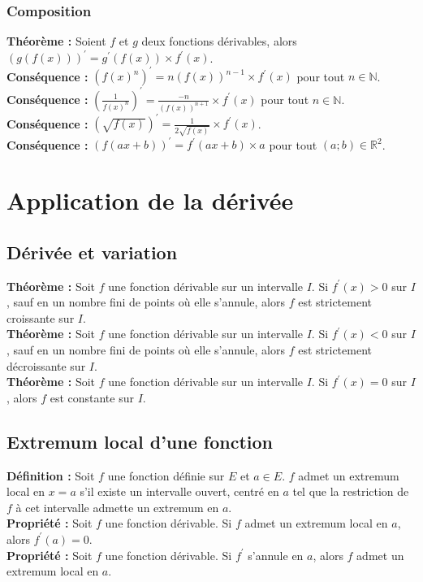 \documentclass[a4paper,titlepage]{article}
\let\oldsection\section
\renewcommand\section{\clearpage\oldsection}
\begin{document}
        \subsubsection{Composition}
            \textbf{Théorème :} Soient $f$ et $g$ deux fonctions dérivables, alors $\left(g\left(f\left(x\right)\right)\right)^{\prime}=g^{\prime}\left(f\left(x\right)\right)\times f^{\prime}\left(x\right)$.
            \\
            \textbf{Conséquence :} $\left(f\left(x\right)^{n}\right)^{\prime}=n\left(f\left(x\right)\right)^{n-1}\times f^{\prime}\left(x\right)$ pour tout $n\in\mathbb{N}$.
            \\
            \textbf{Conséquence :} $\left(\frac{1}{f\left(x\right)^{n}}\right)^{\prime}=\frac{-n}{\left(f\left(x\right)\right)^{n+1}}\times f^{\prime}\left(x\right)$ pour tout $n\in\mathbb{N}$.
            \\
            \textbf{Conséquence :} $\left(\sqrt{f\left(x\right)}\right)^{\prime}=\frac{1}{2\sqrt{f\left(x\right)}}\times f^{\prime}\left(x\right)$.
            \\
            \textbf{Conséquence :} $\left(f\left(ax+b\right)\right)^{\prime}=f^{\prime}\left(ax+b\right)\times a$ pour tout $\left(a;b\right)\in\mathbb{R}^{2}$.
\section{Application de la dérivée}
    \subsection{Dérivée et variation}
        \textbf{Théorème :} Soit $f$ une fonction dérivable sur un intervalle $I$. Si $f^{\prime}\left(x\right)>0$ sur $I$, sauf en un nombre fini de points où elle s’annule, alors $f$ est strictement croissante sur $I$.
        \\
        \textbf{Théorème :} Soit $f$ une fonction dérivable sur un intervalle $I$. Si $f^{\prime}\left(x\right)<0$ sur $I$, sauf en un nombre fini de points où elle s’annule, alors $f$ est strictement décroissante sur $I$.
        \\
        \textbf{Théorème :} Soit $f$ une fonction dérivable sur un intervalle $I$. Si $f^{\prime}\left(x\right)=0$ sur $I$, alors $f$ est constante sur $I$.
    \subsection{Extremum local d’une fonction}
        \textbf{Définition :} Soit $f$ une fonction définie sur $E$ et $a\in E$. $f$ admet un extremum local en $x=a$ s’il existe un intervalle ouvert, centré en $a$ tel que la restriction de $f$ à cet intervalle admette un extremum en $a$.
        \\
        \textbf{Propriété :} Soit $f$ une fonction dérivable. Si $f$ admet un extremum local en $a$, alors $f^{\prime}\left(a\right)=0$.
        \\
        \textbf{Propriété :} Soit $f$ une fonction dérivable. Si $f^{\prime}$ s’annule en $a$, alors $f$ admet un extremum local en $a$.
\end{document}
